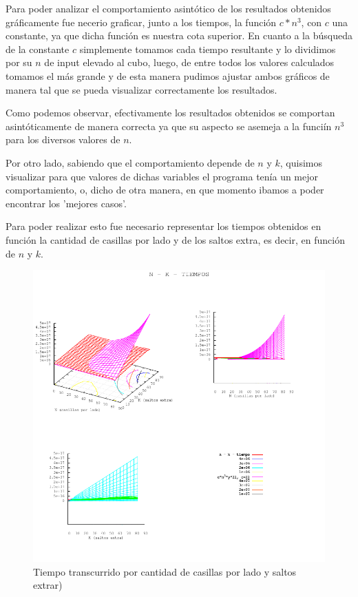 Para poder analizar el comportamiento asint\'otico de los resultados obtenidos gr\'aficamente fue necerio graficar, junto a los tiempos, la funci\'on $c*n^3$, con $c$ una constante, ya que dicha funci\'on es nuestra cota superior.
En cuanto a la b\'usqueda de la constante $c$ simplemente tomamos cada tiempo resultante y lo dividimos por su $n$ de input elevado al cubo, luego, de entre todos los valores calculados tomamos el m\'as grande y de esta manera pudimos ajustar ambos gr\'aficos de manera tal que se pueda visualizar correctamente los resultados.

Como podemos observar, efectivamente los resultados obtenidos se comportan asint\'oticamente de manera correcta ya que su aspecto se asemeja a la funci\'in $n^3$ para los diversos valores de $n$.


Por otro lado, sabiendo que el comportamiento depende de $n$ y $k$, quisimos visualizar para que valores de dichas variables el programa ten\'ia un mejor comportamiento, o, dicho de otra manera, en que momento ibamos a poder encontrar los 'mejores casos'.

Para poder realizar esto fue necesario representar los tiempos obtenidos en funci\'on la cantidad de casillas por lado y de los saltos extra, es decir, en funci\'on de $n$ y $k$. 

\newpage

\begin{center}
\begin{figure}[h!]
\includegraphics[scale=0.7]{./img/ej3_n_k_tiempos.png}
\caption{Tiempo transcurrido por cantidad de casillas por lado y saltos extrar)}
\end{figure}
\end{center}


